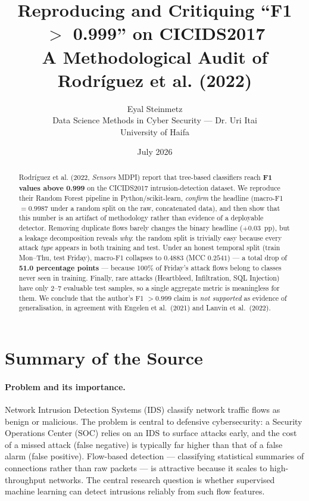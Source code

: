 \documentclass[11pt,a4paper]{article}
\title{\textbf{Reproducing and Critiquing ``F1 $>$ 0.999'' on CICIDS2017}\\[0.3em]
\large A Methodological Audit of Rodr\'iguez et al. (2022)}
\author{Eyal Steinmetz\\
\small Data Science Methods in Cyber Security --- Dr. Uri Itai\\
\small University of Haifa}
\date{July 2026}
\begin{document}
\maketitle

\begin{abstract}
\noindent
Rodr\'iguez et al. (2022, \emph{Sensors} MDPI) report that tree-based classifiers reach
\textbf{F1 values above 0.999} on the CICIDS2017 intrusion-detection dataset. We reproduce
their Random Forest pipeline in Python/scikit-learn, \emph{confirm} the headline
(macro-F1 $=0.9987$ under a random split on the raw, concatenated data), and then show that
this number is an artifact of methodology rather than evidence of a deployable detector.
Removing duplicate flows barely changes the binary headline ($+0.03$~pp), but a leakage
decomposition reveals \emph{why}: the random split is trivially easy because every attack
\emph{type} appears in both training and test. Under an honest temporal split
(train Mon--Thu, test Friday), macro-F1 collapses to $0.4883$ (MCC $0.2541$) --- a total drop
of \textbf{51.0 percentage points} --- because 100\% of Friday's attack flows belong to
classes never seen in training. Finally, rare attacks (Heartbleed, Infiltration, SQL Injection)
have only 2--7 evaluable test samples, so a single aggregate metric is meaningless for them.
We conclude that the author's F1 $>0.999$ claim is \emph{not supported} as evidence of
generalisation, in agreement with Engelen et al.\ (2021) and Lanvin et al.\ (2022).
\end{abstract}

\tableofcontents
\newpage

\section{Summary of the Source}

\paragraph{Problem and its importance.}
Network Intrusion Detection Systems (IDS) classify network traffic flows as benign or
malicious. The problem is central to defensive cybersecurity: a Security Operations Center
(SOC) relies on an IDS to surface attacks early, and the cost of a missed attack
(false negative) is typically far higher than that of a false alarm (false positive).
Flow-based detection --- classifying statistical summaries of connections rather than raw
packets --- is attractive because it scales to high-throughput networks. The central
research question is whether supervised machine learning can detect intrusions reliably from
such flow features.
\end{document}
